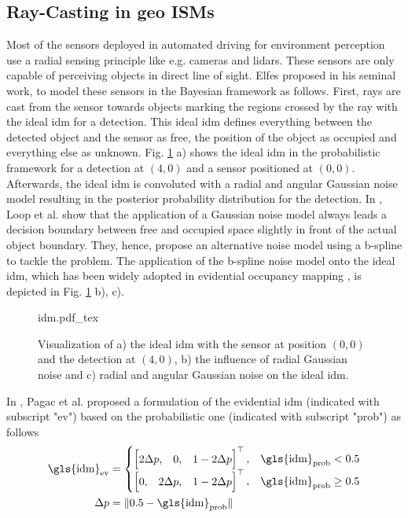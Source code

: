 \subsection{Ray-Casting in geo ISMs}
\label{subsec:ray_casting}
Most of the sensors deployed in automated driving for environment perception use a radial sensing principle like e.g. cameras and lidars. These sensors are only capable of perceiving objects in direct line of sight. Elfes \cite{elfes1989using} proposed in his seminal work, to model these sensors in the Bayesian framework as follows. First, rays are cast from the sensor towards objects marking the regions crossed by the ray with the ideal \gls{idm} for a detection. This ideal \gls{idm} defines everything between the detected object and the sensor as free, the position of the object as occupied and everything else as unknown. Fig. \ref{fig:idm} a) shows the ideal \gls{idm} in the probabilistic framework for a detection at $(4,0)$ and a sensor positioned at $(0,0)$. Afterwards, the ideal \gls{idm} is convoluted with a radial and angular Gaussian noise model resulting in the posterior probability distribution for the detection. In \cite{loop2016closed}, Loop et al. show that the application of a Gaussian noise model always leads a decision boundary between free and occupied space slightly in front of the actual object boundary. They, hence, propose an alternative noise model using a b-spline to tackle the problem. The application of the b-spline noise model onto the ideal \gls{idm}, which has been widely adopted in evidential occupancy mapping \cite{mouhagir2017using,reineking2013evidential,yu2015evidential}, is depicted in Fig. \ref{fig:idm} b), c).
\begin{figure}
	\begin{center}
		{idm.pdf_tex}
		\caption{\label{fig:idm} Visualization of a) the ideal \gls{idm} with the sensor at position $(0,0)$ and the detection at $(4,0)$, b) the influence of radial Gaussian noise and c) radial and angular Gaussian noise on the ideal \gls{idm}.}
	\end{center}
\end{figure}  
In \cite{pagac1996evidential}, Pagac et al. proposed a formulation of the evidential \gls{idm} (indicated with subscript "ev") based on the probabilistic one (indicated with subscript "prob") as follows  
\begin{align}
	\label{eq:ev_ray_casting_model}
	\text{\gls{idm}}_{\text{ev}} &=
	\begin{cases}
		\begin{bmatrix} 2\Delta p, &0, &1 - 2\Delta p \end{bmatrix}^{\top}, & \text{\gls{idm}}_{\text{prob}} < 0.5 \\
		\begin{bmatrix} 0, &2\Delta p, &1 - 2\Delta p \end{bmatrix}^{\top}, & \text{\gls{idm}}_{\text{prob}} \geq 0.5
	\end{cases}\\
	\Delta p &= \| 0.5 - \text{\gls{idm}}_{\text{prob}} \|
\end{align}
